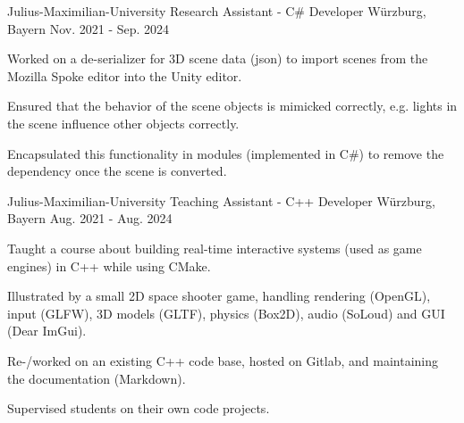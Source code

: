 

\begin{cventries}

  \cventry
    {Julius-Maximilian-University} %
    {Research Assistant - C\# Developer} %
    {Würzburg, Bayern} %
    {Nov. 2021 - Sep. 2024} %
    {
      \begin{cvitems} %
        \item {Worked on a de-serializer for 3D scene data (json) to import scenes from the Mozilla Spoke editor into the Unity editor.}
        \item {Ensured that the behavior of the scene objects is mimicked correctly, e.g. lights in the scene influence other objects correctly.}
        \item {Encapsulated this functionality in modules (implemented in C\#) to remove the dependency once the scene is converted.}
      \end{cvitems}
    }

  \cventry
    {Julius-Maximilian-University} %
    {Teaching Assistant - C++ Developer} %
    {Würzburg, Bayern} %
    {Aug. 2021 - Aug. 2024} %
    {
      \begin{cvitems} %
        \item {Taught a course about building real-time interactive systems (used as game engines) in C++ while using CMake.}
        \item {Illustrated by a small 2D space shooter game, handling rendering (OpenGL), input (GLFW), 3D models (GLTF), physics (Box2D), audio (SoLoud) and GUI (Dear ImGui).}
        \item {Re-/worked on an existing C++ code base, hosted on Gitlab, and maintaining the documentation (Markdown).}
        \item {Supervised students on their own code projects.}
      \end{cvitems}
    }
  

\end{cventries}
